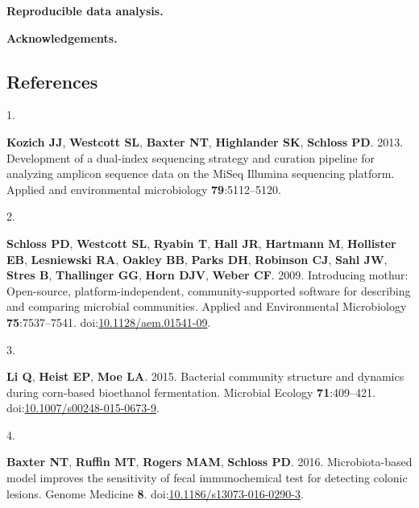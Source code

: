\documentclass[
]{article}
\newlength{\cslhangindent}
\newlength{\csllabelwidth}
\newlength{\cslentryspacingunit} %
\newenvironment{CSLReferences}[2] %
 {%
  \setlength{\parindent}{0pt}
  \ifodd #1
  \let\oldpar\par
  \def\par{\hangindent=\cslhangindent\oldpar}
  \fi
  \setlength{\parskip}{#2\cslentryspacingunit}
 }%
 {}
\newcommand{\CSLLeftMargin}[1]{\parbox[t]{\csllabelwidth}{#1}}
\newcommand{\CSLRightInline}[1]{\parbox[t]{\linewidth - \csllabelwidth}{#1}\break}
\begin{document}
\textbf{Reproducible data analysis.}

\vspace{10mm}

\textbf{Acknowledgements.}

\newpage

\hypertarget{references}{%
\subsection{References}\label{references}}

\setlength{\parindent}{-0.25in}
\setlength{\leftskip}{0.25in}

\noindent

\hypertarget{refs}{}
\begin{CSLReferences}{0}{1}
\leavevmode{}%
\CSLLeftMargin{1. }%
\CSLRightInline{\textbf{Kozich JJ}, \textbf{Westcott SL}, \textbf{Baxter
NT}, \textbf{Highlander SK}, \textbf{Schloss PD}. 2013. {Development of
a dual-index sequencing strategy and curation pipeline for analyzing
amplicon sequence data on the MiSeq Illumina sequencing platform}.
Applied and environmental microbiology \textbf{79}:5112--5120.}

\leavevmode{}%
\CSLLeftMargin{2. }%
\CSLRightInline{\textbf{Schloss PD}, \textbf{Westcott SL},
\textbf{Ryabin T}, \textbf{Hall JR}, \textbf{Hartmann M},
\textbf{Hollister EB}, \textbf{Lesniewski RA}, \textbf{Oakley BB},
\textbf{Parks DH}, \textbf{Robinson CJ}, \textbf{Sahl JW}, \textbf{Stres
B}, \textbf{Thallinger GG}, \textbf{Horn DJV}, \textbf{Weber CF}. 2009.
Introducing mothur: Open-source, platform-independent,
community-supported software for describing and comparing microbial
communities. Applied and Environmental Microbiology
\textbf{75}:7537--7541.
doi:\href{https://doi.org/10.1128/aem.01541-09}{10.1128/aem.01541-09}.}

\leavevmode{}%
\CSLLeftMargin{3. }%
\CSLRightInline{\textbf{Li Q}, \textbf{Heist EP}, \textbf{Moe LA}. 2015.
Bacterial community structure and dynamics during corn-based bioethanol
fermentation. Microbial Ecology \textbf{71}:409--421.
doi:\href{https://doi.org/10.1007/s00248-015-0673-9}{10.1007/s00248-015-0673-9}.}

\leavevmode{}%
\CSLLeftMargin{4. }%
\CSLRightInline{\textbf{Baxter NT}, \textbf{Ruffin MT}, \textbf{Rogers
MAM}, \textbf{Schloss PD}. 2016. Microbiota-based model improves the
sensitivity of fecal immunochemical test for detecting colonic lesions.
Genome Medicine \textbf{8}.
doi:\href{https://doi.org/10.1186/s13073-016-0290-3}{10.1186/s13073-016-0290-3}.}


\end{CSLReferences}
\end{document}
